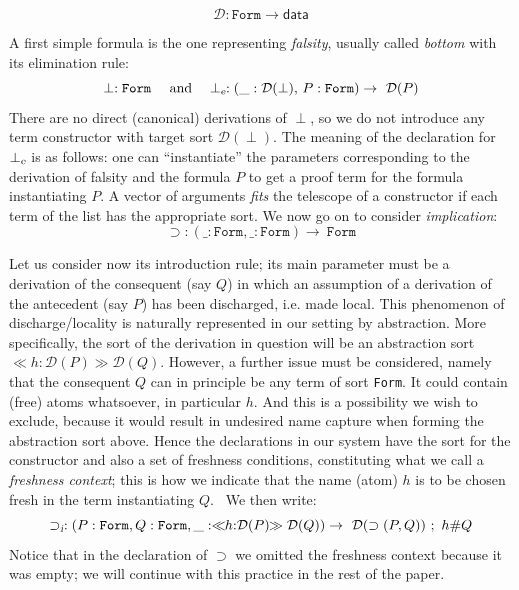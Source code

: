 \documentclass[copyright,creativecommons]{eptcs}
\newcounter{s}
\newcommand{\dabsort}[3]{\ensuremath{\ll\!\!\ntyping{#1}{#2}\!\!\gg #3}}
\newcommand{\depconstrdecl}[3]{\ensuremath{#1 : (#2) \rightarrow\ #3}}
\newcommand{\typing}[2]{\ensuremath{#1 : #2}}
\newcommand{\ntyping}[2]{\ensuremath{#1{:}#2}}
\newcommand{\fresh}[2]{#1 \# #2}
\newcommand{\data}{\ensuremath{\mathsf{data}}}
\newcommand{\fconstrdecl}[4]{\ensuremath{#1 : #2 \rightarrow\ #3\ ;\ #4}}
\newcommand{\cnst}[1]{\textsl{#1}}
\newcommand{\form}{\texttt{Form}}
\newcommand{\prf}{\ensuremath{\mathcal{D}}}
\newcommand{\impl}{\ensuremath{\supset}}
\newcommand{\Frm}{\texttt{Form}}
\begin{document}
\[
\prf: \Frm \to \data
\]

\noindent A first simple formula is the one representing \emph{falsity},
usually called \emph{bottom} with its elimination rule:
\[ \typing{\perp}{\form} \quad \text{ and } \ \ \depconstrdecl{\perp_{\cnst{e}}}{\typing{\_}{\prf(\perp)},\,\typing{P}{\form}}{\prf(P)}\]
\noindent There are no direct (canonical) derivations of $\perp$, so
we do not introduce any term constructor with target sort $\prf(\perp)$.
The meaning of the declaration for $\perp_{\cnst{e}}$ is as follows: one can 
``instantiate'' the parameters corresponding to the derivation of falsity and 
the formula $P$ to get a proof term for the formula instantiating $P$. 
A vector of arguments \emph{fits} the telescope of a constructor if 
each term of the list has the appropriate sort. 
We now go on to consider \emph{implication}:
\[\depconstrdecl{\impl}{\typing{\_}{\form}, \typing{\_}{\form}}{\form}\]

\noindent Let us consider now its introduction rule; its main parameter must be a
derivation of the consequent (say $Q$) in which an assumption of a derivation of the 
antecedent (say $P$) has been discharged, i.e. made local.
This phenomenon of discharge/locality is naturally represented in our setting by abstraction. More specifically, the sort of the derivation in question will be
an abstraction sort \dabsort{h}{\prf(P)}{\prf(Q)}.
%
However, a further issue must be considered, namely that the consequent $Q$
can in principle be any term of sort \form. It could contain (free) atoms
whatsoever, in particular $h$. And this is a possibility we wish to exclude,
because it would result in undesired name capture when forming the abstraction
sort above. Hence the declarations in our system have the sort for the
constructor and also a set of freshness conditions, constituting what we call a \emph{freshness context}; this is how we indicate that 
the name (atom) $h$ is to be chosen fresh in the term instantiating $Q$.  
\ We then write:
\[
\fconstrdecl{\impl_{\cnst{i}}}{(\typing{P}{\form}, \typing{Q}{\form},
    \typing{\_}{\dabsort{h}{\prf(P)}{\prf(Q}))}}{\prf(\impl(P,
    Q))}{\fresh{h}{Q}}
\]
Notice that in the declaration of $\impl$ we omitted the freshness context
because it was empty; we will continue with this practice in the rest of the paper.
\end{document}
